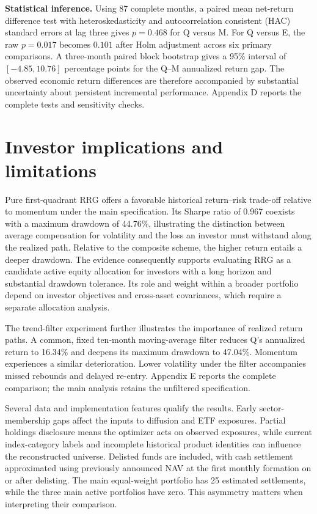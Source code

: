 \textbf{Statistical inference.} Using 87 complete months, a paired mean net-return difference test with heteroskedasticity and autocorrelation consistent (HAC) standard errors at lag three gives $p=0.468$ for Q versus M. For Q versus E, the raw $p=0.017$ becomes $0.101$ after Holm adjustment across six primary comparisons. A three-month paired block bootstrap gives a 95\% interval of $[-4.85,10.76]$ percentage points for the Q--M annualized return gap. The observed economic return differences are therefore accompanied by substantial uncertainty about persistent incremental performance. Appendix D reports the complete tests and sensitivity checks.

\newpage
\section{Investor implications and limitations}
Pure first-quadrant RRG offers a favorable historical return--risk trade-off relative to momentum under the main specification. Its Sharpe ratio of 0.967 coexists with a maximum drawdown of 44.76\%, illustrating the distinction between average compensation for volatility and the loss an investor must withstand along the realized path. Relative to the composite scheme, the higher return entails a deeper drawdown. The evidence consequently supports evaluating RRG as a candidate active equity allocation for investors with a long horizon and substantial drawdown tolerance. Its role and weight within a broader portfolio depend on investor objectives and cross-asset covariances, which require a separate allocation analysis.

The trend-filter experiment further illustrates the importance of realized return paths. A common, fixed ten-month moving-average filter reduces Q's annualized return to 16.34\% and deepens its maximum drawdown to 47.04\%. Momentum experiences a similar deterioration. Lower volatility under the filter accompanies missed rebounds and delayed re-entry. Appendix E reports the complete comparison; the main analysis retains the unfiltered specification.

Several data and implementation features qualify the results. Early sector-membership gaps affect the inputs to diffusion and ETF exposures. Partial holdings disclosure means the optimizer acts on observed exposures, while current index-category labels and incomplete historical product identities can influence the reconstructed universe. Delisted funds are included, with cash settlement approximated using previously announced NAV at the first monthly formation on or after delisting. The main equal-weight portfolio has 25 estimated settlements, while the three main active portfolios have zero. This asymmetry matters when interpreting their comparison.

